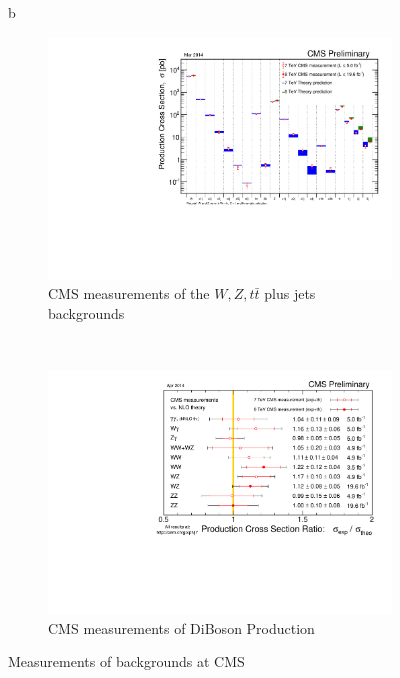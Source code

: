 \begin{figure}{b}
    \centering
    \begin{subfigure}[b]{0.45\textwidth}
        \includegraphics[width=\textwidth]{Figures/Experimental_Results/CMS__VJets_TTbar__SigmaNew_v3.pdf}
        \caption{CMS measurements of the $W,Z,t\bar{t}$ plus jets backgrounds}\label{fig:cms_results_VJets_TTJets}
      \end{subfigure}
      ~ %
      \begin{subfigure}[b]{0.45\textwidth}
        \includegraphics[width=\textwidth]{Figures/Experimental_Results/CMS__DibosonResullts__SigmaR_v5.pdf}
        \caption{CMS measurements of DiBoson Production}\label{fig:cms_results_VV}
      \end{subfigure}
      \caption{Measurements of \ttH backgrounds at CMS} \label{fig:cms_results_backgrounds}
\end{figure}

